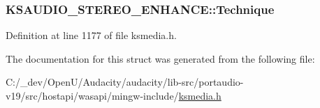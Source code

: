 \subsubsection[{\texorpdfstring{Technique}{Technique}}]{ K\+S\+A\+U\+D\+I\+O\+\_\+\+S\+T\+E\+R\+E\+O\+\_\+\+E\+N\+H\+A\+N\+C\+E\+::\+Technique}\hypertarget{struct_k_s_a_u_d_i_o___s_t_e_r_e_o___e_n_h_a_n_c_e_a3dfa5ed56e3347419b9fcf3242159c15}{}\label{struct_k_s_a_u_d_i_o___s_t_e_r_e_o___e_n_h_a_n_c_e_a3dfa5ed56e3347419b9fcf3242159c15}


Definition at line 1177 of file ksmedia.\+h.



The documentation for this struct was generated from the following file\+:\begin{DoxyCompactItemize}
\item 
C\+:/\+\_\+dev/\+Open\+U/\+Audacity/audacity/lib-\/src/portaudio-\/v19/src/hostapi/wasapi/mingw-\/include/\hyperlink{ksmedia_8h}{ksmedia.\+h}\end{DoxyCompactItemize}

